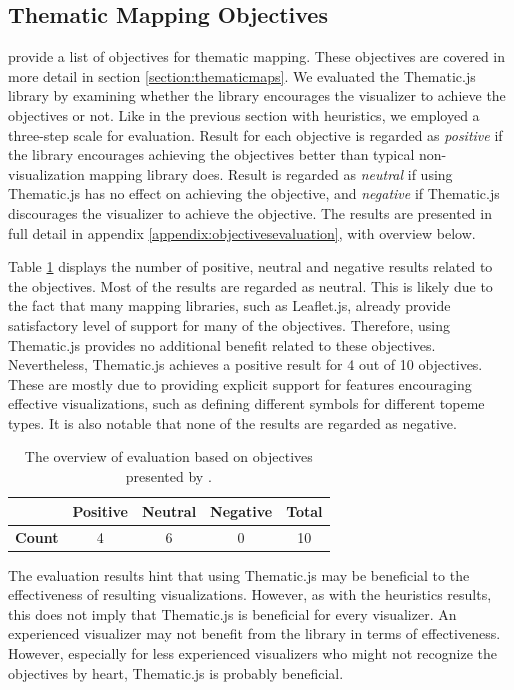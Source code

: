 \subsection{Thematic Mapping Objectives}

\citet{schlichtmann_visualization_2002} provide a list of objectives for thematic mapping. These objectives are covered in more detail in section \ref{section:thematicmaps}. We evaluated the Thematic.js library by examining whether the library encourages the visualizer to achieve the objectives or not. Like in the previous section with heuristics, we employed a three-step scale for evaluation. Result for each objective is regarded as \emph{positive} if the library encourages achieving the objectives better than typical non-visualization mapping library does. Result is regarded as \emph{neutral} if using Thematic.js has no effect on achieving the objective, and \emph{negative} if Thematic.js discourages the visualizer to achieve the objective. The results are presented in full detail in appendix \ref{appendix:objectivesevaluation}, with overview below.

Table \ref{table:objectivesevaluationoverview} displays the number of positive, neutral and negative results related to the objectives. Most of the results are regarded as neutral. This is likely due to the fact that many mapping libraries, such as Leaflet.js, already provide satisfactory level of support for many of the objectives. Therefore, using Thematic.js provides no additional benefit related to these objectives. Nevertheless, Thematic.js achieves a positive result for 4 out of 10 objectives. These are mostly due to providing explicit support for features encouraging effective visualizations, such as defining different symbols for different topeme types. It is also notable that none of the results are regarded as negative.

\begin{table}[h]
\centering
\begin{tabular}{|l|c|c|c|c|}
\hline
 & \textbf{Positive} & \textbf{Neutral} & \textbf{Negative} & \textbf{Total} \\ 
\hline
\textbf{Count} & 4 & 6 & 0 & 10 \\
\hline
\end{tabular}
\caption{The overview of evaluation based on objectives presented by \citet{schlichtmann_visualization_2002}.}
\label{table:objectivesevaluationoverview}
\end{table}

The evaluation results hint that using Thematic.js may be beneficial to the effectiveness of resulting visualizations. However, as with the heuristics results, this does not imply that Thematic.js is beneficial for every visualizer. An experienced visualizer may not benefit from the library in terms of effectiveness. However, especially for less experienced visualizers who might not recognize the objectives by heart, Thematic.js is probably beneficial.
